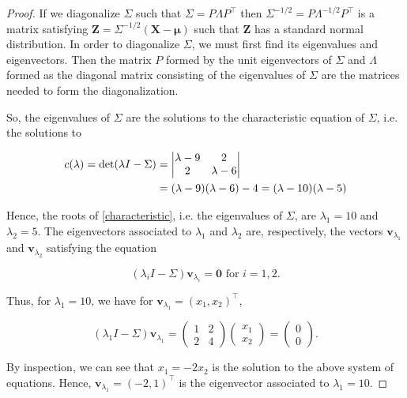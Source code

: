 \documentclass[12pt]{article}
\theoremstyle{definition}
\newcommand{\vect}[1]{\boldsymbol{#1}}
\begin{document}
\begin{proof}
  If we diagonalize $\Sigma$ such that $\Sigma = P \Lambda P^\intercal$ then
  $\Sigma^{-1/2} = P \Lambda^{-1/2} P^{\intercal}$ is a matrix satisfying
  $\vect{Z} = \Sigma^{-1/2}(\vect{X} - \vect{\mu})$ such that $\vect{Z}$ has a
  standard normal distribution. In order to diagonalize
  $\Sigma$, we must first find its eigenvalues and eigenvectors. Then the
  matrix $P$ formed by the unit eigenvectors of $\Sigma$ and $\Lambda$ formed as
  the diagonal matrix consisting of the eigenvalues of $\Sigma$ are the
  matrices needed to form the diagonalization.

  So, the eigenvalues of $\Sigma$ are the solutions to the characteristic
  equation of $\Sigma$, i.e. the solutions to

  \begin{align}\label{characteristic}
    c(\lambda)
    = \det(\lambda I - \Sigma) \notag
    &= \left| \begin{matrix} \lambda - 9 & 2 \\ 2 & \lambda - 6\end{matrix}\right| \notag \\
    &= (\lambda - 9)(\lambda - 6) - 4 = (\lambda - 10)(\lambda - 5)
  \end{align}

  Hence, the roots of \eqref{characteristic}, i.e. the eigenvalues of $\Sigma$,
  are $\lambda_1 = 10$ and $\lambda_2 = 5.$ The eigenvectors associated to
  $\lambda_1$ and $\lambda_2$ are, respectively, the vectors $\vect{v}_{\lambda_1}$
  and $\vect{v}_{\lambda_2}$ satisfying the equation

  \[
    (\lambda_i I - \Sigma) \vect{v}_{\lambda_i} = \vect{0} \text{\ \ for $i = 1, 2$}.
  \]

  Thus, for $\lambda_1 = 10$, we have for
  $\vect{v}_{\lambda_1} = (x_1, x_2)^\intercal$,

  \[
    (\lambda_1 I - \Sigma) \vect{v}_{\lambda_1} = \left(\begin{matrix} 1 & 2 \\ 2 & 4\end{matrix} \right)
    \left( \begin{matrix} x_1 \\ x_2 \end{matrix}\right) = \left( \begin{matrix} 0 \\ 0 \end{matrix}\right).
  \]

  By inspection, we can see that $x_1 = -2x_2$ is the solution to the above
  system of equations. Hence, $\vect{v}_{\lambda_1} = (-2, 1)^\intercal$ is the
  eigenvector associated to $\lambda_1 = 10$.


\end{proof}
\end{document}

